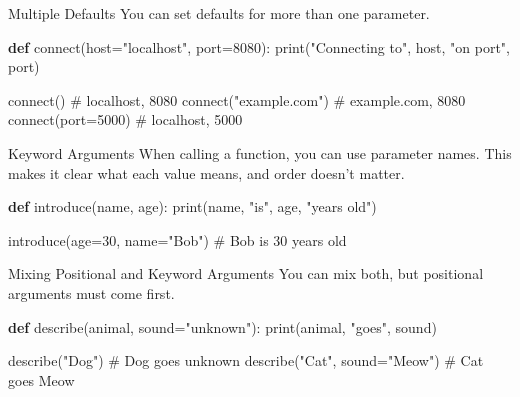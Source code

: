 \documentclass[
  letterpaper,
  DIV=11,
  numbers=noendperiod]{scrreprt}
\newenvironment{Shaded}{\begin{snugshade}}{\end{snugshade}}
\newcommand{\BuiltInTok}[1]{\textcolor[rgb]{0.00,0.23,0.31}{#1}}
\newcommand{\CommentTok}[1]{\textcolor[rgb]{0.37,0.37,0.37}{#1}}
\newcommand{\DecValTok}[1]{\textcolor[rgb]{0.68,0.00,0.00}{#1}}
\newcommand{\ExtensionTok}[1]{\textcolor[rgb]{0.00,0.23,0.31}{#1}}
\newcommand{\KeywordTok}[1]{\textcolor[rgb]{0.00,0.23,0.31}{\textbf{#1}}}
\newcommand{\NormalTok}[1]{\textcolor[rgb]{0.00,0.23,0.31}{#1}}
\newcommand{\OperatorTok}[1]{\textcolor[rgb]{0.37,0.37,0.37}{#1}}
\newcommand{\StringTok}[1]{\textcolor[rgb]{0.13,0.47,0.30}{#1}}
\begin{document}
Multiple Defaults You can set defaults for more than one parameter.

\begin{Shaded}
\begin{Highlighting}[]
\KeywordTok{def} \ExtensionTok{connect}\NormalTok{(host}\OperatorTok{=}\StringTok{"localhost"}\NormalTok{, port}\OperatorTok{=}\DecValTok{8080}\NormalTok{):}
    \BuiltInTok{print}\NormalTok{(}\StringTok{"Connecting to"}\NormalTok{, host, }\StringTok{"on port"}\NormalTok{, port)}

\ExtensionTok{connect}\NormalTok{()                      }\CommentTok{\# localhost, 8080}
\ExtensionTok{connect}\NormalTok{(}\StringTok{"example.com"}\NormalTok{)         }\CommentTok{\# example.com, 8080}
\ExtensionTok{connect}\NormalTok{(port}\OperatorTok{=}\DecValTok{5000}\NormalTok{)             }\CommentTok{\# localhost, 5000}
\end{Highlighting}
\end{Shaded}

Keyword Arguments When calling a function, you can use parameter names.
This makes it clear what each value means, and order doesn't matter.

\begin{Shaded}
\begin{Highlighting}[]
\KeywordTok{def}\NormalTok{ introduce(name, age):}
    \BuiltInTok{print}\NormalTok{(name, }\StringTok{"is"}\NormalTok{, age, }\StringTok{"years old"}\NormalTok{)}

\NormalTok{introduce(age}\OperatorTok{=}\DecValTok{30}\NormalTok{, name}\OperatorTok{=}\StringTok{"Bob"}\NormalTok{)  }\CommentTok{\# Bob is 30 years old}
\end{Highlighting}
\end{Shaded}

Mixing Positional and Keyword Arguments You can mix both, but positional
arguments must come first.

\begin{Shaded}
\begin{Highlighting}[]
\KeywordTok{def}\NormalTok{ describe(animal, sound}\OperatorTok{=}\StringTok{"unknown"}\NormalTok{):}
    \BuiltInTok{print}\NormalTok{(animal, }\StringTok{"goes"}\NormalTok{, sound)}

\NormalTok{describe(}\StringTok{"Dog"}\NormalTok{)                      }\CommentTok{\# Dog goes unknown}
\NormalTok{describe(}\StringTok{"Cat"}\NormalTok{, sound}\OperatorTok{=}\StringTok{"Meow"}\NormalTok{)        }\CommentTok{\# Cat goes Meow}
\end{Highlighting}
\end{Shaded}
\end{document}
